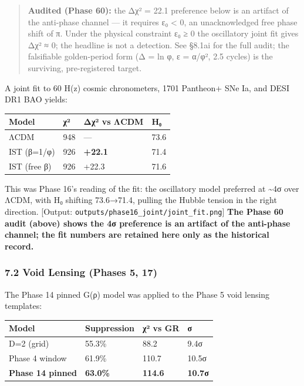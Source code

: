 \documentclass[
]{article}
\begin{document}
\begin{quote}
\textbf{Audited (Phase 60):} the Δχ² = 22.1 preference below is an
artifact of the anti-phase channel --- it requires ε₀ \textless{} 0, an
unacknowledged free phase shift of π. Under the physical constraint ε₀ ≥
0 the oscillatory joint fit gives Δχ² ≈ 0; the headline is not a
detection. See §8.1ai for the full audit; the falsifiable golden-period
form (Δ = ln φ, ε = α/φ², 2.5 cycles) is the surviving, pre-registered
target.
\end{quote}

A joint fit to 60 H(z) cosmic chronometers, 1701 Pantheon+ SNe Ia, and
DESI DR1 BAO yields:

\begin{longtable}[]{@{}llll@{}}
\toprule\noalign{}
Model & χ² & Δχ² vs ΛCDM & H₀ \\
\midrule\noalign{}
\endhead
\bottomrule\noalign{}
\endlastfoot
ΛCDM & 948 & --- & 73.6 \\
IST (β=1/φ) & 926 & \textbf{+22.1} & 71.4 \\
IST (free β) & 926 & +22.3 & 71.6 \\
\end{longtable}

This was Phase 16's reading of the fit: the oscillatory model preferred
at \textasciitilde4σ over ΛCDM, with H₀ shifting 73.6→71.4, pulling the
Hubble tension in the right direction. {[}Output:
\texttt{outputs/phase16\_joint/joint\_fit.png}{]} \textbf{The Phase 60
audit (above) shows the 4σ preference is an artifact of the anti-phase
channel; the fit numbers are retained here only as the historical
record.}

\subsubsection{7.2 Void Lensing (Phases 5,
17)}\label{void-lensing-phases-5-17}

The Phase 14 pinned G(ρ) model was applied to the Phase 5 void lensing
templates:

\begin{longtable}[]{@{}llll@{}}
\toprule\noalign{}
Model & Suppression & χ² vs GR & σ \\
\midrule\noalign{}
\endhead
\bottomrule\noalign{}
\endlastfoot
D=2 (grid) & 55.3\% & 88.2 & 9.4σ \\
Phase 4 window & 61.9\% & 110.7 & 10.5σ \\
\textbf{Phase 14 pinned} & \textbf{63.0\%} & \textbf{114.6} &
\textbf{10.7σ} \\
\end{longtable}
\end{document}
